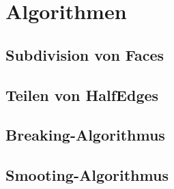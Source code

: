 \section{Algorithmen}
\subsection{Subdivision von Faces}
\subsection{Teilen von HalfEdges}
\subsection{Breaking-Algorithmus}
\subsection{Smooting-Algorithmus}